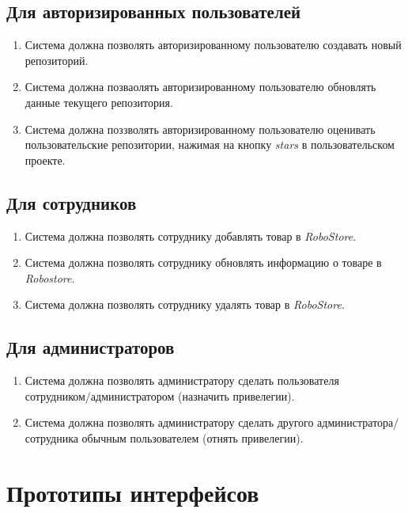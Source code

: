 \documentclass[12pt, a4paper]{article}
\begin{document}
\subsection{Для авторизированных пользователей}

\begin{enumerate}
\item Система должна позволять авторизированному пользователю 
  создавать новый репозиторий.
\item Система должна позваолять авторизированному пользователю 
  обновлять данные текущего репозитория.
\item Система должна поззволять авторизированному пользователю 
  оценивать пользовательские репозитории, нажимая на кнопку \textit{stars} 
  в пользовательском проекте.
\end{enumerate}

\subsection{Для сотрудников}

\begin{enumerate}
\item Система должна позволять сотруднику добавлять товар в
    \textit{RoboStore}.
\item Система должна позволять сотруднику обновлять информацию 
  о товаре в \textit{Robostore}.
\item Система должна позволять сотруднику удалять товар в 
  \textit{RoboStore}.
\end{enumerate}

\subsection{Для администраторов}

\begin{enumerate}
\item Система должна позволять администратору сделать пользователя 
  сотрудником/администратором (назначить привелегии).
\item Система должна позволять администратору сделать другого 
  администратора/сотрудника обычным пользователем (отнять привелегии).
\end{enumerate}

\section{Прототипы интерфейсов}
\end{document}
